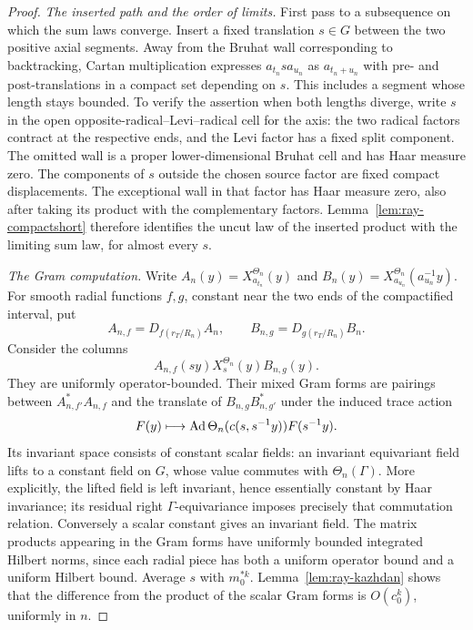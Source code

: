 \begin{proof}
\par\smallskip\noindent\textit{The inserted path and the order of limits.}\quad
First pass to a subsequence on which the sum laws converge.
Insert a fixed translation \(s\in G\) between the two positive
axial segments.  Away from the Bruhat wall corresponding to
backtracking, Cartan multiplication expresses
\(a_{t_n}s a_{u_n}\) as \(a_{t_n+u_n}\) with pre- and
post-translations in a compact set depending on \(s\).
This includes a segment whose length stays bounded.  To verify
the assertion when both lengths diverge, write \(s\) in the
open opposite-radical--Levi--radical cell for the axis: the two
radical factors contract at the respective ends, and the Levi
factor has a fixed split component.  The omitted wall is a
proper lower-dimensional Bruhat cell and has Haar measure zero.
The components of \(s\) outside the chosen source factor are
fixed compact displacements.  The exceptional wall in that factor
has Haar measure zero, also after taking its product with the
complementary factors.  Lemma~\ref{lem:ray-compactshort} therefore identifies the uncut law
of the inserted product with the limiting sum law, for almost
every \(s\).

\par\smallskip\noindent\textit{The Gram computation.}\quad
Write \(A_n(y)=X^{\Theta_n}_{a_{t_n}}(y)\) and
\(B_n(y)=X^{\Theta_n}_{a_{u_n}}(a_{u_n}^{-1}y)\).
For smooth radial functions \(f,g\), constant near the two
ends of the compactified interval, put
\begin{equation}
 A_{n,f}=D_{f(r_T/R_n)}A_n,\qquad
 B_{n,g}=D_{g(r_T/R_n)}B_n .
 \label{eq:ray-cut-columns}
\end{equation}
Consider the columns
\begin{equation}
 A_{n,f}(sy)X^{\Theta_n}_s(y)B_{n,g}(y).
 \label{eq:ray-inserted-columns}
\end{equation}
They are uniformly operator-bounded.  Their mixed Gram forms
are pairings between
\(A_{n,f'}^*A_{n,f}\) and the translate of
\(B_{n,g}B_{n,g'}^*\) under the induced trace action
\[
 F(y)\longmapsto
 \operatorname{Ad}\Theta_n(c(s,s^{-1}y))F(s^{-1}y).
\]
Its invariant space consists of constant scalar fields:
an invariant equivariant field lifts to a constant field on
\(G\), whose value commutes with \(\Theta_n(\Gamma)\).
More explicitly, the lifted field is left invariant, hence
essentially constant by Haar invariance; its residual right
\(\Gamma\)-equivariance imposes precisely that commutation
relation.  Conversely a scalar constant gives an invariant field.
The matrix products appearing in the Gram forms have uniformly
bounded integrated Hilbert norms, since each radial piece has
both a uniform operator bound and a uniform Hilbert bound.
Average \(s\) with \(m_0^{*k}\).  Lemma~\ref{lem:ray-kazhdan}
shows that the difference from the product of the scalar Gram
forms is \(O(c_0^k)\), uniformly in \(n\).


\end{proof}
